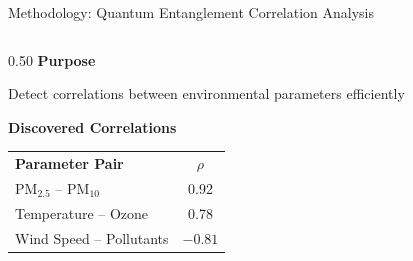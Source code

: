 \documentclass[aspectratio=169,10pt]{beamer}
\begin{document}
\begin{frame}{Methodology: Quantum Entanglement Correlation Analysis}

\begin{columns}[T]
    \begin{column}{0.50\textwidth}
        \textbf{\color{primaryblue}\small Purpose}
        \vspace{0.05cm}

        \footnotesize
        Detect correlations between environmental parameters efficiently

        \vspace{0.15cm}

        \vspace{0.15cm}

        \textbf{\color{primaryblue}\footnotesize Discovered Correlations}
        \vspace{0.1cm}

        \scriptsize
        \renewcommand{\arraystretch}{1.15}
        \begin{tabular}{p{3.2cm}c}
            \rowcolor{primaryblue!10}
            \textbf{Parameter Pair} & \textbf{$\rho$} \\
            PM$_{2.5}$ -- PM$_{10}$ & 0.92 \\
            \rowcolor{softgray}
            Temperature -- Ozone & 0.78 \\
            Wind Speed -- Pollutants & $-0.81$ \\
        \end{tabular}
    \end{column}


\end{columns}
\end{frame}
\end{document}
